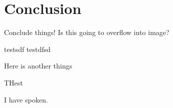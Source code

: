 \section{Conclusion}\label{sec:conclusion}
Conclude things!
Is this going to overflow into image?


testsdf
testdfsd

Here is another things

THest

I have spoken.
